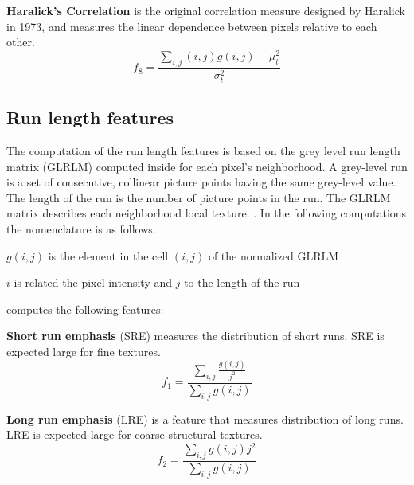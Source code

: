 \documentclass{InsightArticle}
\begin{document}
\textbf{Haralick's Correlation} is the original correlation measure designed by Haralick in 1973, and measures the linear dependence between pixels relative to each other.
\begin{equation} \label{eqn:ShapeInfluenceTerm}
f_8 = \frac{\sum_{i,j}\nolimits (i,j)g(i,j)-\mu _t^2}{\sigma _t^2}
\end{equation}

\subsection{Run length features}
\label{sec:RLFeat}

The computation of the run length features is based on the grey level run length matrix (GLRLM) computed inside  for each pixel's neighborhood. A grey-level run is a set of consecutive, collinear picture points having the same grey-level value. The length of the run is the number of picture points in the run. The GLRLM matrix describes each neighborhood local texture. \cite{RLFeat1,RLFeat2,RLFeat3,RLFeat4}. In the following computations the nomenclature is as follows:

\begin{math} g(i,j) \end{math} is the element in the cell \begin{math}(i,j)\end{math} of the normalized GLRLM

\begin{math} i \end{math} is related the pixel intensity and \begin{math} j \end{math} to the length of the run

 computes the following features:

\textbf{Short run emphasis} (SRE) measures the distribution of short runs. SRE is expected large for fine textures.
\begin{equation} \label{eqn:ShapeInfluenceTerm}
f_1 = \frac{\sum_{i,j}\nolimits \frac{g(i, j)}{j^2}}{\sum_{i,j}\nolimits g(i, j)}
\end{equation}

\textbf{Long run emphasis} (LRE) is a feature that measures distribution of long runs. LRE is expected large for coarse structural textures.
\begin{equation} \label{eqn:ShapeInfluenceTerm}
f_2 = \frac{\sum_{i,j}\nolimits g(i, j)j^2}{\sum_{i,j}\nolimits g(i, j)}
\end{equation}
\end{document}
